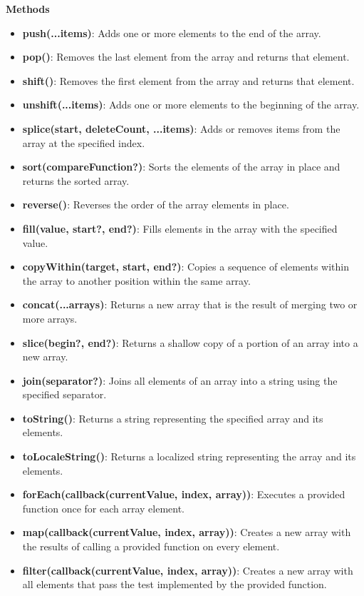 \documentclass{report}
\begin{document}
    \bigbreak \noindent 
    \textbf{Methods}
    \begin{itemize}
        \item \textbf{push(...items)}: Adds one or more elements to the end of the array.
        \item \textbf{pop()}: Removes the last element from the array and returns that element.
        \item \textbf{shift()}: Removes the first element from the array and returns that element.
        \item \textbf{unshift(...items)}: Adds one or more elements to the beginning of the array.
        \item \textbf{splice(start, deleteCount, ...items)}: Adds or removes items from the array at the specified index.
        \item \textbf{sort(compareFunction?)}: Sorts the elements of the array in place and returns the sorted array.
        \item \textbf{reverse()}: Reverses the order of the array elements in place.
        \item \textbf{fill(value, start?, end?)}: Fills elements in the array with the specified value.
        \item \textbf{copyWithin(target, start, end?)}: Copies a sequence of elements within the array to another position within the same array.
        \item \textbf{concat(...arrays)}: Returns a new array that is the result of merging two or more arrays.
        \item \textbf{slice(begin?, end?)}: Returns a shallow copy of a portion of an array into a new array.
        \item \textbf{join(separator?)}: Joins all elements of an array into a string using the specified separator.
        \item \textbf{toString()}: Returns a string representing the specified array and its elements.
        \item \textbf{toLocaleString()}: Returns a localized string representing the array and its elements.
        \item \textbf{forEach(callback(currentValue, index, array))}: Executes a provided function once for each array element.
        \item \textbf{map(callback(currentValue, index, array))}: Creates a new array with the results of calling a provided function on every element.
        \item \textbf{filter(callback(currentValue, index, array))}: Creates a new array with all elements that pass the test implemented by the provided function.

\end{itemize}
\end{document}

